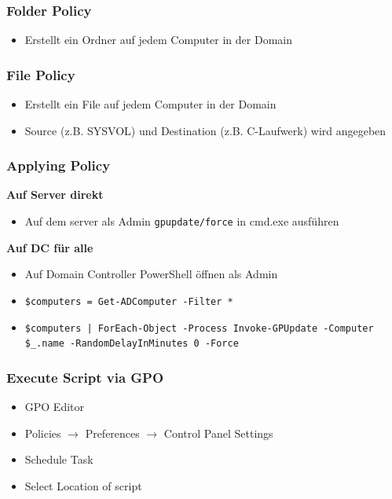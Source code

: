 \subsubsection{Folder Policy}
\begin{itemize}
    \item Erstellt ein Ordner auf jedem Computer in der Domain
\end{itemize}

\subsubsection{File Policy}
\begin{itemize}
    \item Erstellt ein File auf jedem Computer in der Domain
    \item Source (z.B. SYSVOL) und Destination (z.B. C-Laufwerk) wird angegeben
\end{itemize}

\subsubsection{Applying Policy}
\textbf{Auf Server direkt}
\begin{itemize}
    \item Auf dem server als Admin \texttt{\small gpupdate/force} in cmd.exe ausführen
\end{itemize}

\textbf{Auf DC für alle}
\begin{itemize}
    \item Auf Domain Controller PowerShell öffnen als Admin
    \item \texttt{\scriptsize \$computers = Get-ADComputer -Filter *}
    \item \texttt{\scriptsize \$computers | ForEach-Object -Process {Invoke-GPUpdate -Computer \$\_.name -RandomDelayInMinutes 0 -Force}}
\end{itemize}

\subsubsection{Execute Script via GPO}
\begin{itemize}
    \item GPO Editor
    \item Policies $\rightarrow$ Preferences $\rightarrow$ Control Panel Settings
    \item Schedule Task
    \item Select Location of script
\end{itemize}

